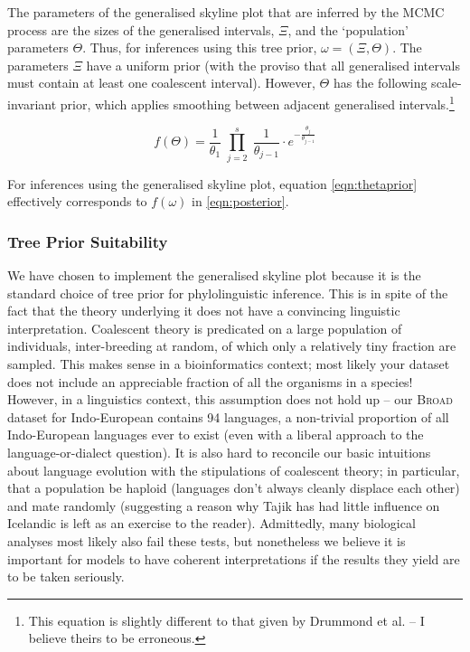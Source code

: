 \documentclass[10pt,journal,compsoc]{IEEEtran}
\begin{document}
The parameters of the generalised skyline plot that are inferred by the MCMC process are the sizes of the generalised intervals, $\Xi$, and the `population' parameters $\Theta$. Thus, for inferences using this tree prior, $\omega = (\Xi, \Theta)$. The parameters $\Xi$ have a uniform prior (with the proviso that all generalised intervals must contain at least one coalescent interval). However, $\Theta$ has the following scale-invariant prior, which applies smoothing between adjacent generalised intervals.\footnote{This equation is slightly different to that given by Drummond et al. -- I believe theirs to be erroneous.}

\begin{equation}\label{eqn:thetaprior}
    f(\Theta) = \frac{1}{\theta_1} \; \prod_{j=2}^s\; \frac{1}{\theta_{j-1}} \cdot e^{-\frac{\theta_j}{\theta_{j-1}}}
\end{equation}

For inferences using the generalised skyline plot, equation \eqref{eqn:thetaprior} effectively corresponds to $f(\omega)$ in \eqref{eqn:posterior}.

\subsubsection{Tree Prior Suitability}

We have chosen to implement the generalised skyline plot because it is the standard choice of tree prior for phylolinguistic inference. This is in spite of the fact that the theory underlying it does not have a convincing linguistic interpretation. Coalescent theory is predicated on a large population of individuals, inter-breeding at random, of which only a relatively tiny fraction are sampled. This makes sense in a bioinformatics context; most likely your dataset does not include an appreciable fraction of all the organisms in a species! However, in a linguistics context, this assumption does not hold up -- our \textsc{Broad} dataset for Indo-European contains 94 languages, a non-trivial proportion of all Indo-European languages ever to exist (even with a liberal approach to the language-or-dialect question). It is also hard to reconcile our basic intuitions about language evolution with the stipulations of coalescent theory; in particular, that a population be haploid (languages don't always cleanly displace each other) and mate randomly (suggesting a reason why Tajik has had little influence on Icelandic is left as an exercise to the reader). Admittedly, many biological analyses most likely also fail these tests, but nonetheless we believe it is important for models to have coherent interpretations if the results they yield are to be taken seriously.
\end{document}
